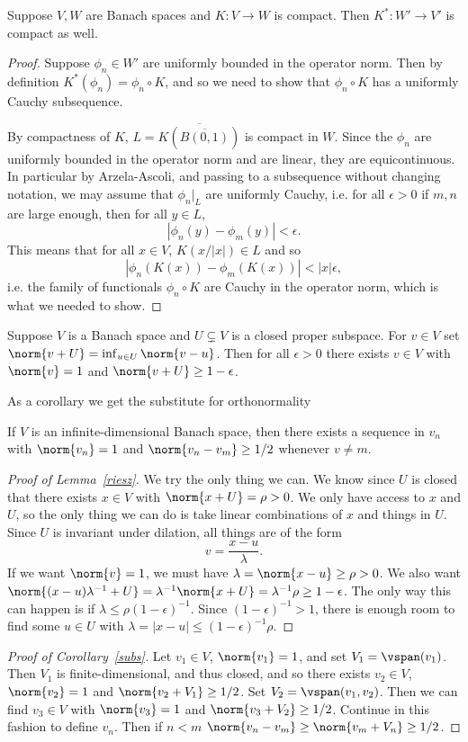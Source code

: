 \documentclass[12pt]{article}
\begin{document}
\begin{lem}{\label{comp}}Suppose $V,W$ are Banach spaces and $K:V\to W$ is compact. Then $K^\ast:W' \to V'$ is compact as well.\end{lem}
\begin{proof}
Suppose $\phi_n \in W'$ are uniformly bounded in the operator norm. Then by definition $K^\ast(\phi_n) = \phi_n\circ K$, and so we need to show that $\phi_n\circ K$ has a uniformly Cauchy subsequence.

By compactness of $K$, $L = \overline{K(\overline{B(0,1)})}$ is compact in $W$. Since the $\phi_n$ are uniformly bounded in the operator norm and are linear, they are equicontinuous. In particular by Arzela-Ascoli, and passing to a subsequence without changing notation, we may assume that $\phi_n|_{L}$ are uniformly Cauchy, i.e. for all $\epsilon > 0$ if $m,n$ are large enough, then for all $y \in L$,
\[|\phi_n(y)-\phi_m(y)| < \epsilon.\] This means that for all $x \in V$, $K(x/|x|) \in L$ and so
\[|\phi_n(K(x))-\phi_m(K(x))| < |x|\epsilon,\]
i.e. the family of functionals $\phi_n\circ K$ are Cauchy in the operator norm, which is what we needed to show.
\end{proof}
\begin{lem}[Riesz]\label{riesz}Suppose $V$ is a Banach space and $U \subsetneq V$ is a closed proper subspace. For $v \in V$ set $\norm{v+U} = \inf_{u \in U} \norm{v-u}$. Then for all $\epsilon > 0$ there exists $v \in V$ with $\norm{v} = 1$ and $\norm{v+U} \geq 1-\epsilon$.\end{lem}
As a corollary we get the substitute for orthonormality
\begin{cor}\label{subs}If $V$ is an infinite-dimensional Banach space, then there exists a sequence in $v_n$ with $\norm{v_n} = 1$ and $\norm{v_n-v_m} \geq 1/2$ whenever $v \neq m$.\end{cor}
\begin{proof}[Proof of Lemma~\ref{riesz}]We try the only thing we can. We know since $U$ is closed that there exists $x \in V$ with $\norm{x+U} = \rho > 0$. We only have access to $x$ and $U$, so the only thing we can do is take linear combinations of $x$ and things in $U$. Since $U$ is invariant under dilation, all things are of the form
\[v = \frac{x-u}{\lambda}.\] If we want $\norm{v} = 1$, we must have $\lambda = \norm{x-u} \geq \rho > 0$. We also want $\norm{(x-u)\lambda^{-1}+U} = \lambda^{-1}\norm{x+U} = \lambda^{-1}\rho\geq 1-\epsilon$. The only way this can happen is if $\lambda \leq \rho(1-\epsilon)^{-1}$. Since $(1-\epsilon)^{-1} > 1$, there is enough room to find some $u \in U$ with $\lambda = |x-u| \leq (1-\epsilon)^{-1}\rho$.\end{proof}
\begin{proof}[Proof of Corollary~\ref{subs}]Let $v_1 \in V$, $\norm{v_1} = 1$, and set $V_1 = \vspan(v_1)$. Then $V_1$ is finite-dimensional, and thus closed, and so there exists $v_2 \in V$, $\norm{v_2} = 1$ and $\norm{v_2+V_1} \geq 1/2$. Set $V_2 = \vspan(v_1,v_2)$. Then we can find $v_3 \in V$ with $\norm{v_3} = 1$ and $\norm{v_3+V_2} \geq 1/2$. Continue in this fashion to define $v_n$. Then if $n < m$ $\norm{v_n-v_m} \geq \norm{v_m+V_n} \geq 1/2$.\end{proof}
\end{document}
